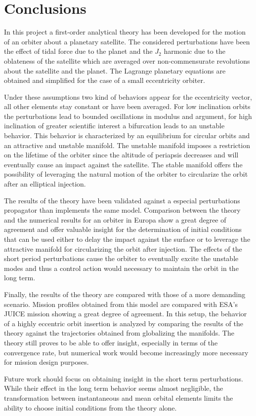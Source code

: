 \section{Conclusions}

In this project a first-order analytical theory has been developed for the motion of an orbiter about a planetary satellite. The considered perturbations have been the effect of tidal force due to the planet and the $J_2$ harmonic due to the oblateness of the satellite which are averaged over non-commensurate revolutions about the satellite and the planet. The Lagrange planetary equations are obtained and simplified for the case of a small eccentricity orbiter. 

Under these assumptions two kind of behaviors appear for the eccentricity vector, all other elements stay constant or have been averaged. For low inclination orbits the perturbations lead to bounded oscillations in modulus and argument, for high inclination of greater scientific interest a bifurcation leads to an unstable behavior. This behavior is characterized by an equilibrium for circular orbits and an attractive and unstable manifold. The unstable manifold imposes a restriction on the lifetime of the orbiter since the altitude of periapsis decreases and will eventually cause an impact against the satellite. The stable manifold offers the possibility of leveraging the natural motion of the orbiter to circularize the orbit after an elliptical injection.

The results of the theory have been validated against a especial perturbations propagator than implements the same model. Comparison between the theory and the numerical results for an orbiter in Europa show a great degree of agreement and offer valuable insight for the determination of initial conditions that can be used either to delay the impact against the surface or to leverage the attractive manifold for circularizing the orbit after injection. The effects of the short period perturbations cause the orbiter to eventually excite the unstable modes and thus a control action would necessary to maintain the orbit in the long term.

Finally, the results of the theory are compared with those of a more demanding scenario. Mission profiles obtained from this model are compared with ESA's JUICE mission showing a great degree of agreement. In this setup, the behavior of a highly eccentric orbit insertion is analyzed by comparing the results of the theory against the trajectories obtained from globalizing the manifolds. The theory still proves to be able to offer insight, especially in terms of the convergence rate, but numerical work would become increasingly more necessary for mission design purposes.

Future work should focus on obtaining insight in the short term perturbations. While their effect in the long term behavior seems almost negligible, the transformation between instantaneous and mean orbital elements limits the ability to choose initial conditions from the theory alone.